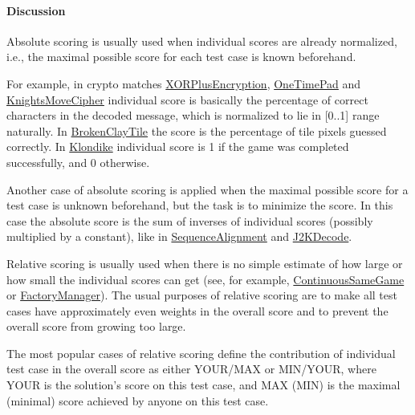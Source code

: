 \hypertarget{discussion-3}{%
\paragraph{Discussion}\label{discussion-3}}

Absolute scoring is usually used when individual scores are already
normalized, i.e., the maximal possible score for each test case is known
beforehand.

For example, in crypto matches
\href{http://community.topcoder.com/longcontest/?module=ViewProblemStatement\&rd=12202\&pm=9798}{XORPlusEncryption},
\href{http://community.topcoder.com/longcontest/?module=ViewProblemStatement\&rd=13564\&pm=9906}{OneTimePad}
and
\href{http://community.topcoder.com/longcontest/?module=ViewProblemStatement\&rd=13679\&pm=10242}{KnightsMoveCipher}
individual score is basically the percentage of correct characters in
the decoded message, which is normalized to lie in {[}0..1{]} range
naturally. In
\href{http://community.topcoder.com/longcontest/?module=ViewProblemStatement\&rd=14209\&pm=10756}{BrokenClayTile}
the score is the percentage of tile pixels guessed correctly. In
\href{http://community.topcoder.com/longcontest/?module=ViewProblemStatement\&rd=13565\&pm=10014}{Klondike}
individual score is 1 if the game was completed successfully, and 0
otherwise.

Another case of absolute scoring is applied when the maximal possible
score for a test case is unknown beforehand, but the task is to minimize
the score. In this case the absolute score is the sum of inverses of
individual scores (possibly multiplied by a constant), like in
\href{http://community.topcoder.com/longcontest/?module=ViewProblemStatement\&rd=13797\&pm=10390}{SequenceAlignment}
and
\href{http://community.topcoder.com/longcontest/?module=ViewProblemStatement\&rd=13772\&pm=10328}{J2KDecode}.

Relative scoring is usually used when there is no simple estimate of how
large or how small the individual scores can get (see, for example,
\href{http://community.topcoder.com/longcontest/?module=ViewProblemStatement\&rd=10815\&pm=7789}{ContinuousSameGame}
or
\href{http://community.topcoder.com/longcontest/?module=ViewProblemStatement\&rd=12198\&pm=8472}{FactoryManager}).
The usual purposes of relative scoring are to make all test cases have
approximately even weights in the overall score and to prevent the
overall score from growing too large.

The most popular cases of relative scoring define the contribution of
individual test case in the overall score as either YOUR/MAX or
MIN/YOUR, where YOUR is the solution's score on this test case, and MAX
(MIN) is the maximal (minimal) score achieved by anyone on this test
case.

